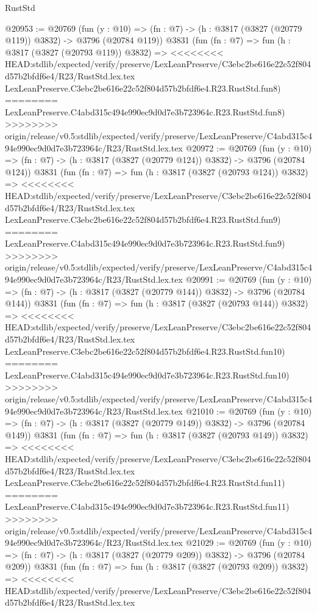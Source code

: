 \begin{lexlean}{RustStd}
\begin{coremodule}
{\begin{coremodule}
{{{{{{{{{{{{{{{{{{{{{{{{{{{{{{{{{{{@20953 := @20769
    (fun (y : @10) => (fn : @7) -> (h : @3817 (@3827 (@20779 @119)) @3832) -> @3796 (@20784 @119))
    @3831
    (fun (fn : @7) =>
    fun (h : @3817 (@3827 (@20793 @119)) @3832) =>
<<<<<<<< HEAD:stdlib/expected/verify/preserve/LexLeanPreserve/C3ebc2be616e22c52f804d57b2bfdf6e4/R23/RustStd.lex.tex
    LexLeanPreserve.C3ebc2be616e22c52f804d57b2bfdf6e4.R23.RustStd.fun8)
========
    LexLeanPreserve.C4abd315c494e990ec9d0d7e3b723964c.R23.RustStd.fun8)
>>>>>>>> origin/release/v0.5:stdlib/expected/verify/preserve/LexLeanPreserve/C4abd315c494e990ec9d0d7e3b723964c/R23/RustStd.lex.tex
@20972 := @20769
    (fun (y : @10) => (fn : @7) -> (h : @3817 (@3827 (@20779 @124)) @3832) -> @3796 (@20784 @124))
    @3831
    (fun (fn : @7) =>
    fun (h : @3817 (@3827 (@20793 @124)) @3832) =>
<<<<<<<< HEAD:stdlib/expected/verify/preserve/LexLeanPreserve/C3ebc2be616e22c52f804d57b2bfdf6e4/R23/RustStd.lex.tex
    LexLeanPreserve.C3ebc2be616e22c52f804d57b2bfdf6e4.R23.RustStd.fun9)
========
    LexLeanPreserve.C4abd315c494e990ec9d0d7e3b723964c.R23.RustStd.fun9)
>>>>>>>> origin/release/v0.5:stdlib/expected/verify/preserve/LexLeanPreserve/C4abd315c494e990ec9d0d7e3b723964c/R23/RustStd.lex.tex
@20991 := @20769
    (fun (y : @10) => (fn : @7) -> (h : @3817 (@3827 (@20779 @144)) @3832) -> @3796 (@20784 @144))
    @3831
    (fun (fn : @7) =>
    fun (h : @3817 (@3827 (@20793 @144)) @3832) =>
<<<<<<<< HEAD:stdlib/expected/verify/preserve/LexLeanPreserve/C3ebc2be616e22c52f804d57b2bfdf6e4/R23/RustStd.lex.tex
    LexLeanPreserve.C3ebc2be616e22c52f804d57b2bfdf6e4.R23.RustStd.fun10)
========
    LexLeanPreserve.C4abd315c494e990ec9d0d7e3b723964c.R23.RustStd.fun10)
>>>>>>>> origin/release/v0.5:stdlib/expected/verify/preserve/LexLeanPreserve/C4abd315c494e990ec9d0d7e3b723964c/R23/RustStd.lex.tex
@21010 := @20769
    (fun (y : @10) => (fn : @7) -> (h : @3817 (@3827 (@20779 @149)) @3832) -> @3796 (@20784 @149))
    @3831
    (fun (fn : @7) =>
    fun (h : @3817 (@3827 (@20793 @149)) @3832) =>
<<<<<<<< HEAD:stdlib/expected/verify/preserve/LexLeanPreserve/C3ebc2be616e22c52f804d57b2bfdf6e4/R23/RustStd.lex.tex
    LexLeanPreserve.C3ebc2be616e22c52f804d57b2bfdf6e4.R23.RustStd.fun11)
========
    LexLeanPreserve.C4abd315c494e990ec9d0d7e3b723964c.R23.RustStd.fun11)
>>>>>>>> origin/release/v0.5:stdlib/expected/verify/preserve/LexLeanPreserve/C4abd315c494e990ec9d0d7e3b723964c/R23/RustStd.lex.tex
@21029 := @20769
    (fun (y : @10) => (fn : @7) -> (h : @3817 (@3827 (@20779 @209)) @3832) -> @3796 (@20784 @209))
    @3831
    (fun (fn : @7) =>
    fun (h : @3817 (@3827 (@20793 @209)) @3832) =>
<<<<<<<< HEAD:stdlib/expected/verify/preserve/LexLeanPreserve/C3ebc2be616e22c52f804d57b2bfdf6e4/R23/RustStd.lex.tex
}}}}}}}}}}}}}}}}}}}}}}}}}}}}}}}}}}}
\end{coremodule}}
\end{coremodule}
\end{lexlean}
